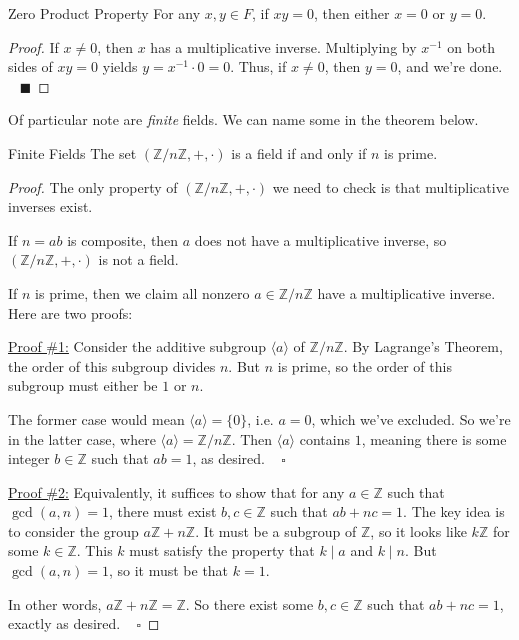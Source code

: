 \begin{theorem}{Zero Product Property}
    For any $x, y \in F$, if $xy = 0$, then either $x = 0$ or $y = 0$.
\end{theorem}

\begin{proof}
    If $x \neq 0$, then $x$ has a multiplicative inverse.  Multiplying by $x^{-1}$ on both sides of $xy = 0$ yields $y = x^{-1} \cdot 0 = 0$.  Thus, if $x \neq 0$, then $y = 0$, and we're done. ~ $\blacksquare$
\end{proof}

Of particular note are \emph{finite} fields.  We can name some in the theorem below.

\begin{theorem}{Finite Fields}
    The set $(\mathbb{Z}/n \mathbb{Z}, +, \cdot)$ is a field if and only if $n$ is prime.
\end{theorem}

\begin{proof}
    The only property of $(\mathbb{Z}/n\mathbb{Z}, +, \cdot)$ we need to check is that multiplicative inverses exist.

    If $n = ab$ is composite, then $a$ does not have a multiplicative inverse, so $(\mathbb{Z}/n\mathbb{Z}, +, \cdot)$ is not a field.

    If $n$ is prime, then we claim all nonzero $a \in \mathbb{Z}/n\mathbb{Z}$ have a multiplicative inverse.  Here are two proofs:

    \underline{Proof \#1:} Consider the additive subgroup $\langle a \rangle$ of $\mathbb{Z}/n\mathbb{Z}$.  By Lagrange's Theorem, the order of this subgroup divides $n$.  But $n$ is prime, so the order of this subgroup must either be $1$ or $n$.
    
    The former case would mean $\langle a \rangle = \{0\}$, i.e. $a = 0$, which we've excluded.  So we're in the latter case, where $\langle a \rangle = \mathbb{Z}/n\mathbb{Z}$.  Then $\langle a \rangle$ contains $1$, meaning there is some integer $b \in \mathbb{Z}$ such that $ab = 1$, as desired. ~ $\square$

    \underline{Proof \#2:} Equivalently, it suffices to show that for any $a \in \mathbb{Z}$ such that $\gcd(a, n) = 1$, there must exist $b, c \in \mathbb{Z}$ such that $ab + nc = 1$.  The key idea is to consider the group $a\mathbb{Z} + n\mathbb{Z}$.  It must be a subgroup of $\mathbb{Z}$, so it looks like $k\mathbb{Z}$ for some $k \in \mathbb{Z}$.  This $k$ must satisfy the property that $k \mid a$ and $k \mid n$.  But $\gcd(a, n) = 1$, so it must be that $k = 1$.
    
    In other words, $a\mathbb{Z} + n\mathbb{Z} = \mathbb{Z}$.  So there exist some $b, c \in \mathbb{Z}$ such that $ab + nc = 1$, exactly as desired. ~ $\square$
\end{proof}

